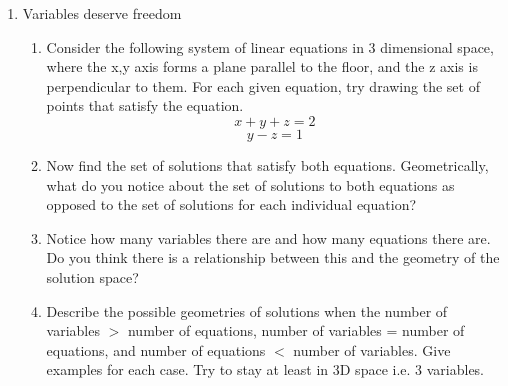 \documentclass{article}
\begin{document}
\begin{enumerate}
    \item Variables deserve freedom
    \begin{enumerate}
        \item Consider the following system of linear equations in 3 dimensional space, where the x,y axis forms a plane parallel to the floor, and the z axis is perpendicular to them. For each given equation, try drawing the set of points that satisfy the equation.
        \[ x + y + z = 2  \]
        \[ y - z = 1  \]
        \item Now find the set of solutions that satisfy both equations. Geometrically, what do you notice about the set of solutions to both equations as opposed to the set of solutions for each individual equation?
        \item Notice how many variables there are and how many equations there are. Do you think there is a relationship between this and the geometry of the solution space?
        \item Describe the possible geometries of solutions when the number of variables $>$ number of equations, number of variables = number of equations, and number of equations $<$ number of variables. Give examples for each case. Try to stay at least in 3D space i.e. 3 variables.
    \end{enumerate}
  \end{enumerate}  
\end{document}
